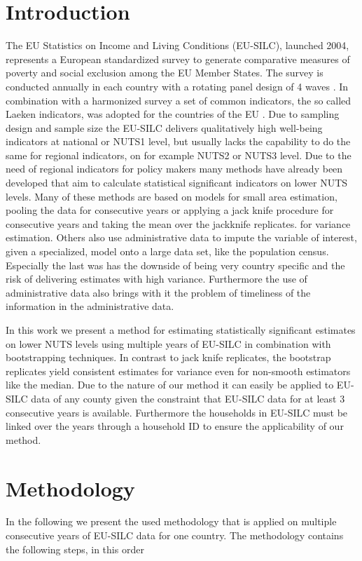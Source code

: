 \documentclass{scrartcl}\usepackage[]{graphicx}\usepackage[]{color}
\begin{document}
\section{Introduction}

The EU Statistics on Income and Living Conditions (EU-SILC), launched 2004, represents a European standardized survey to generate comparative measures of poverty and social exclusion among the EU Member States. The survey is conducted annually in each country with a rotating panel design of 4 waves \citep[see][]{vebe2006}. In combination with a harmonized survey a set of common indicators, the so called Laeken indicators, was adopted for the countries of the EU \citep[see][]{atkinson2002}.
\newline
Due to sampling design and sample size the EU-SILC delivers qualitatively high well-being indicators at national or NUTS1 level, but usually lacks the capability to do the same for regional indicators, on for example NUTS2 or NUTS3 level. Due to the need of regional indicators for policy makers many methods have already been developed that aim to calculate statistical significant indicators on lower NUTS levels.\citep{gigaleva2012,povmap}
Many of these methods are based on models for small area estimation, pooling the data for consecutive years or applying a jack knife procedure for consecutive years and taking the mean over the jackknife replicates. for variance estimation. Others also use administrative data to impute the variable of interest, given a specialized, model onto a large data set, like the population census. Especially the last was has the downside of being very country specific and the risk of delivering estimates with high variance. Furthermore the use of administrative data also brings with it the problem of timeliness of the information in the administrative data.

In this work we present a method for estimating statistically significant estimates on lower NUTS levels using multiple years of EU-SILC in combination with bootstrapping techniques. In contrast to jack knife replicates, the bootstrap replicates yield consistent estimates for variance even for non-smooth estimators like the median. Due to the nature of our method it can easily be applied to EU-SILC data of any county given the constraint that EU-SILC data for at least 3 consecutive years is available. Furthermore the households in EU-SILC must be linked over the years through a household ID to ensure the applicability of our method.


\section{Methodology}
In the following we present the used methodology that is applied on multiple consecutive years of EU-SILC data for one country. The methodology contains the following steps, in this order
\end{document}
